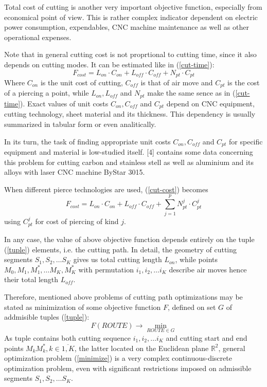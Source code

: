 \documentclass{ifacconf}
\begin{document}
Total cost of cutting is another very important
objective function,
especially from economical point of view.
This is rather complex indicator dependent on
electric power consumption,
expendables,
CNC machine maintenance
as well as other operational expenses.

Note that in general cutting cost is not
proprtional to cutting time,
since it also depends on cutting modes.
It can be estimated like in (\ref{cut-time}):
\begin{equation}
    F_{cost} = L_{on}\cdot C_{on} + L_{off}\cdot C_{off} + N_{pt} \cdot C_{pt}
    \label{cut-cost}
\end{equation}
Where
$C_{on}$ is the unit cost of cutting,
$C_{off}$ is that of air move and
$C_{pt}$ is the cost of a piercing a point,
while $L_{on}, L_{off}$ and $N_{pt}$
make the same sence as in (\ref{cut-time}).
Exact values of unit costs
$C_{on}, C_{off}$ and $C_{pt}$
depend on CNC equipment, cutting technology,
sheet material and its thickness.
This dependency is usually summarized
in tabular form or even analitically.

In its turn,
the task of finding appropriate unit costs
$C_{on}, C_{off}$ and $C_{pt}$
for specific equipment and material
is  low-studied itself.
[4] contains some data concerning this problem
for cutting carbon and stainless stell
as well as aluminium and its alloys
with laser CNC machine ByStar 3015.

When different pierce technologies are used,
(\ref{cut-cost}) becomes
\begin{equation}
    F_{cost} = L_{on}\cdot C_{on} + L_{off}\cdot C_{off}
    + \sum_{j=1}^p N_{pt}^j \cdot C_{pt}^j
    \label{piercings-cost}
\end{equation}
using $C_{pt}^j$ for
cost of piercing of kind $j$.

In any case,
the value of above objective function
depends entirely on the tuple (\ref{tuple})
elements,
i.e. the cutting path.
In detail,
the geometry of cutting segments
$S_1, S_2, \dots S_K$ gives us
total cutting length $L_{on}$,
while points $M_0, M_1, M_1^*, \dots M_K, M_K^*$
with permutation $i_1, i_2, \dots i_K$
describe air moves hence their total length $L_{off}$.

Therefore,
mentioned above problems
of cutting path optimizations may be
stated as minimization of some objective function $F$,
defined on set $G$ of addmisible tuples (\ref{tuple}):
\begin{equation}
    F(ROUTE) \to \min_{ROUTE \in G}
    \label{minimize}
\end{equation}
As tuple contains both
cutting sequence
$i_1, i_2, \dots i_K$
and cutting start and end points
$M_kM_k^*, k \in \overline{1, K}$,
the latter located on the Euclidean plane $\mathbb R^2$,
general optimization problem (\ref{minimize})
is a very complex
continuous-discrete optimization problem,
even with significant restrictions imposed
on admissible segments
$S_1, S_2, \dots S_K$.
\end{document}
